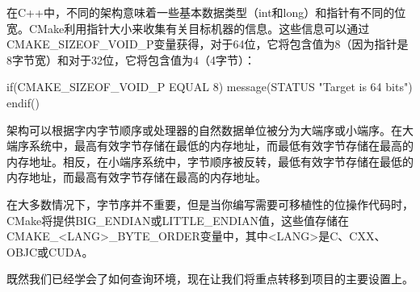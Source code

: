 在C++中，不同的架构意味着一些基本数据类型（int和long）和指针有不同的位宽。CMake利用指针大小来收集有关目标机器的信息。这些信息可以通过CMAKE\_SIZEOF\_VOID\_P变量获得，对于64位，它将包含值为8（因为指针是8字节宽）和对于32位，它将包含值为4（4字节）：

\begin{cmake}
if(CMAKE_SIZEOF_VOID_P EQUAL 8)
    message(STATUS "Target is 64 bits")
endif()
\end{cmake}


架构可以根据字内字节顺序或处理器的自然数据单位被分为大端序或小端序。在大端序系统中，最高有效字节存储在最低的内存地址，而最低有效字节存储在最高的内存地址。相反，在小端序系统中，字节顺序被反转，最低有效字节存储在最低的内存地址，而最高有效字节存储在最高的内存地址。

在大多数情况下，字节序并不重要，但是当你编写需要可移植性的位操作代码时，CMake将提供BIG\_ENDIAN或LITTLE\_ENDIAN值，这些值存储在CMAKE\_<LANG>\_BYTE\_ORDER变量中，其中<LANG>是C、CXX、OBJC或CUDA。

既然我们已经学会了如何查询环境，现在让我们将重点转移到项目的主要设置上。





















